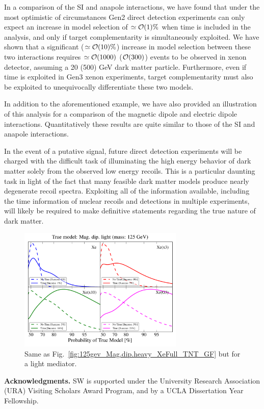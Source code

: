 \documentclass[11pt]{article}
\newcommand{\Fig}[1]{Fig.~\ref{#1}} \newcommand{\Figs}[2]{Figs.~\ref{#1} and \ref{#2}}
\begin{document}
In a comparison of the SI and anapole interactions, we have found that under the most optimistic of circumstances Gen2 direct detection experiments can only expect an increase in model selection of $\simeq {\cal O}(1)\%$ when time is included in the analysis, and only if target complementarity is simultaneously exploited. We have shown that a significant ($\simeq {\cal O}(10)\%$) increase in model selection between these two interactions requires $\simeq {\cal O}(1000)$ (${\cal O}(300)$) events to be observed in xenon detector, assuming a 20 (500) GeV dark matter particle. Furthermore, even if time is exploited in Gen3 xenon experiments, target complementarity must also be exploited to unequivocally differentiate these two models.

In addition to the aforementioned example, we have also provided an illustration of this analysis for a comparison of the magnetic dipole and electric dipole interactions. Quantitatively these results are quite similar to those of the SI and anapole interactions.

In the event of a putative signal, future direct detection experiments will be charged with the difficult task of illuminating the high energy behavior of dark matter solely from the observed low energy recoils. This is a particular daunting task in light of the fact that many feasible dark matter models produce nearly degenerate recoil spectra. Exploiting all of the information available, including the time information of nuclear recoils and detections in multiple experiments, will likely be required to make definitive statements regarding the true nature of dark matter.

\begin{figure}
\centering
\includegraphics[width=0.7\textwidth]{plots/PDF_125GeV_Magdiplight_50sims_Xe_Xe3x_Xe10x_XeG3_GF_TNT.pdf}
\caption{\label{fig:125gev_Mag.dip.light_XeFull_TNT_GF}
Same as \Fig{fig:125gev_Mag.dip.heavy_XeFull_TNT_GF} but for a light mediator. }
\end{figure}


\bigskip

\textbf{Acknowledgments.} SW is supported under the University Research Association (URA) Visiting Scholars Award Program, and by a UCLA Dissertation Year Fellowship. %




\end{document}
